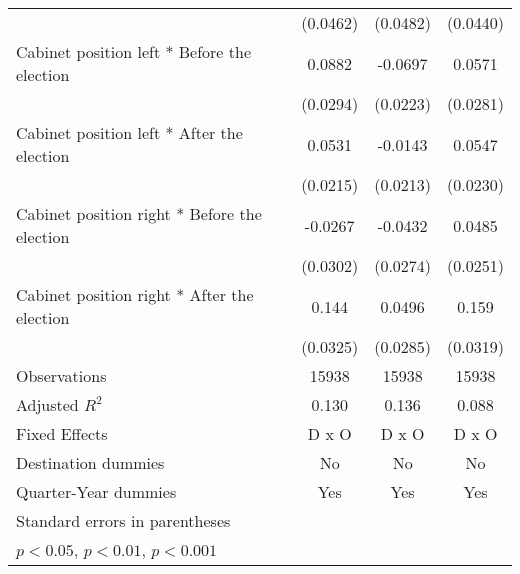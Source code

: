 \begin{table}[htbp]
\begin{tabular}{l*{3}{c}}
                    &    (0.0462)         &    (0.0482)         &    (0.0440)         \\
[1em]
Cabinet position left * Before the election&      0.0882\sym{**} &     -0.0697\sym{**} &      0.0571\sym{*}  \\
                    &    (0.0294)         &    (0.0223)         &    (0.0281)         \\
[1em]
Cabinet position left * After the election&      0.0531\sym{*}  &     -0.0143         &      0.0547\sym{*}  \\
                    &    (0.0215)         &    (0.0213)         &    (0.0230)         \\
[1em]
Cabinet position right * Before the election&     -0.0267         &     -0.0432         &      0.0485         \\
                    &    (0.0302)         &    (0.0274)         &    (0.0251)         \\
[1em]
Cabinet position right * After the election&       0.144\sym{***}&      0.0496         &       0.159\sym{***}\\
                    &    (0.0325)         &    (0.0285)         &    (0.0319)         \\
\hline
Observations        &       15938         &       15938         &       15938         \\
Adjusted \(R^{2}\)  &       0.130         &       0.136         &       0.088         \\
Fixed Effects       &       D x O         &       D x O         &       D x O         \\
Destination dummies &          No         &          No         &          No         \\
Quarter-Year dummies&         Yes         &         Yes         &         Yes         \\
\hline\hline
\multicolumn{4}{l}{\footnotesize Standard errors in parentheses}\\
\multicolumn{4}{l}{\footnotesize \sym{*} \(p<0.05\), \sym{**} \(p<0.01\), \sym{***} \(p<0.001\)}\\
\end{tabular}
\end{table}
